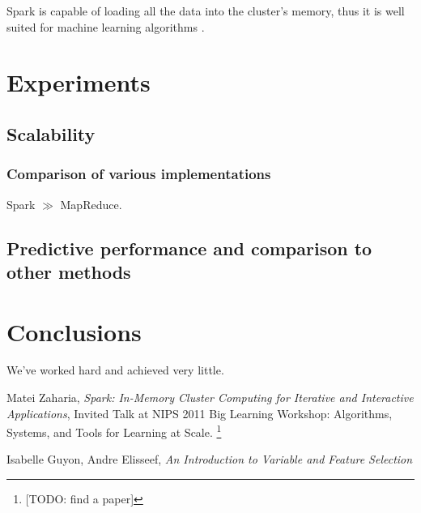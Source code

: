 \documentclass[12pt]{report}
\begin{document}
Spark is capable of loading all the data into the cluster's memory, thus it is well suited for machine learning algorithms \cite{zaharia}.


\chapter{Experiments}
\label{chap:experiments}

\section{Scalability}
\subsection{Comparison of various implementations}

Spark $\gg$ MapReduce.

\section{Predictive performance and comparison to other methods}

\chapter{Conclusions}

We've worked hard and achieved very little.

\begin{thebibliography}{9}

 Matei Zaharia, \emph{Spark: In-Memory Cluster Computing for Iterative and
                  Interactive Applications}, Invited Talk at NIPS 2011 Big Learning
                  Workshop: Algorithms, Systems, and Tools for Learning at Scale.
                  \footnote{[TODO: find a paper]}
                  
 Isabelle Guyon, Andre Elisseef, \emph{An Introduction to Variable and
                Feature Selection}

\end{thebibliography}
\end{document}
